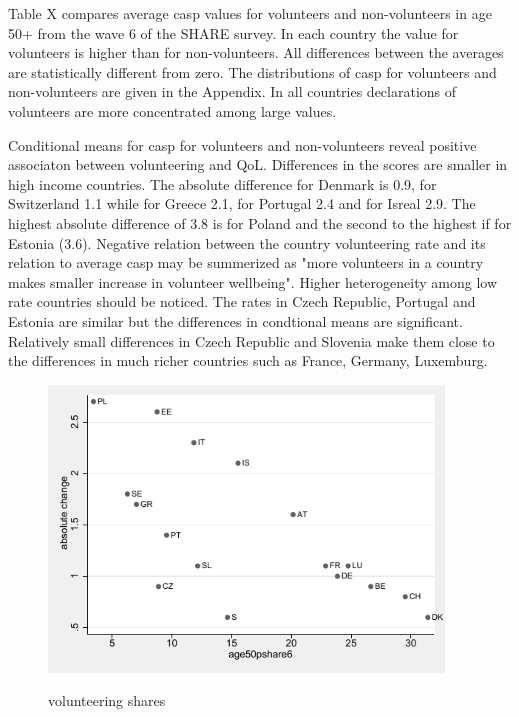 \documentclass[10pt, letterpaper]{article}
\begin{document}
\begin{spacing}{1.4}
Table X compares average casp values for volunteers and non-volunteers in age 50+ from the wave 6 of the SHARE survey. In each country the value for volunteers is higher than for non-volunteers.  All differences between the averages are statistically different from zero. The distributions of casp for volunteers and non-volunteers are given in the Appendix. In all countries declarations of volunteers are more concentrated among large values.  


\begin{spacing}{.9}
\centering 
\begin{scriptsize} 
	 
      \label{CaspTtest} 
\end{scriptsize}
\end{spacing}


Conditional means for casp for volunteers and non-volunteers reveal positive associaton between volunteering and QoL.  Differences in the scores are smaller in high income countries. The absolute difference for Denmark  is 0.9, for Switzerland 1.1 while for Greece 2.1, for Portugal 2.4 and for Isreal 2.9. The highest absolute difference of 3.8 is for Poland and the second to the highest if for Estonia (3.6). Negative relation between the country volunteering rate and its relation to average casp may be summerized as "more volunteers in a country makes smaller increase in volunteer wellbeing". Higher heterogeneity among low rate countries should be noticed. The rates in Czech Republic, Portugal and Estonia are similar but the differences in condtional means are significant. Relatively small differences in Czech Republic and Slovenia make them close to the differences in much richer countries such as France, Germany, Luxemburg. \\

\begin{figure}[H]
 \includegraphics[height=3in]{abs_casp.pdf}
 \centering
 \label{fig:oecd_50p}
\caption{volunteering shares}
\end{figure}



\end{spacing}
\end{document}
